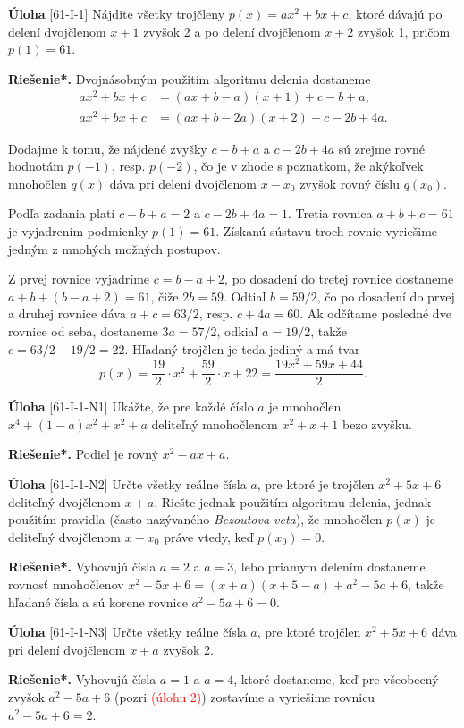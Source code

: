 \documentclass{article}
\newcommand{\rieh}{\textbf{Riešenie*.} }
\newcommand\todo[1]{\noindent\textcolor{red}{(#1)}}
\newcommand{\problem}[4]{
  \begin{tcolorbox}[breakable,notitle,boxrule=0pt,colback=light-gray,colframe=light-gray]
    \textbf{Úloha}
    [#1] #3
  \end{tcolorbox}
  \noindent#4
}
\begin{document}
\problem{61-I-1}{}{
Nájdite všetky trojčleny $p(x) = ax^2 + bx + c$, ktoré dávajú po delení dvojčlenom $x + 1$ zvyšok 2 a po delení dvojčlenom $x + 2$ zvyšok 1, pričom $p(1) = 61$.
}{
\rieh Dvojnásobným použitím algoritmu delenia dostaneme
\begin{align*}
    ax^2+ bx + c &= (ax + b - a)(x + 1) + c - b + a,\\
    ax^2+ bx + c &= (ax + b - 2a)(x + 2) + c - 2b + 4a.
\end{align*}

Dodajme k tomu, že nájdené zvyšky $c - b + a$ a $c - 2b + 4a$ sú zrejme rovné hodnotám $p(-1)$, resp. $p(-2)$, čo je v zhode s poznatkom, že akýkoľvek mnohočlen $q(x)$ dáva pri delení dvojčlenom $x - x_0$ zvyšok rovný číslu $q(x_0)$.

Podľa zadania platí $c - b + a = 2$ a $c - 2b + 4a = 1$. Tretia rovnica $a + b + c = 61$ je vyjadrením podmienky $p(1) = 61$. Získanú sústavu troch rovníc vyriešime jedným z mnohých možných postupov.

Z prvej rovnice vyjadríme $c = b - a + 2$, po dosadení do tretej rovnice dostaneme $a + b + (b - a + 2) = 61$, čiže $2b = 59$. Odtiaľ $b = 59/2$, čo po dosadení do prvej a druhej rovnice dáva $a+c = 63/2$, resp. $c+4a = 60$. Ak odčítame posledné dve rovnice od seba, dostaneme $3a = 57/2$, odkiaľ $a = 19/2$, takže $c = 63/2 - 19/2 = 22$. Hľadaný trojčlen je teda jediný a má tvar
$$p(x) =\frac{19}{2} \cdot x^2+\frac{59}{2}\cdot x + 22 = \frac{19x^2 + 59x + 44}{2}.$$
}


\problem{61-I-1-N1}{}{
Ukážte, že pre každé číslo $a$ je mnohočlen $x^4+(1-a)x^2+x^2+a$ deliteľný mnohočlenom $x^2+ x + 1$ bezo zvyšku.
}{
\rieh Podiel je rovný $x^2 - ax + a$.
}

\problem{61-I-1-N2}{}{
Určte všetky reálne čísla $a$, pre ktoré je trojčlen $x^2+5x+6$ deliteľný dvojčlenom $x+a$. Riešte jednak použitím algoritmu delenia, jednak použitím pravidla (často nazývaného \textit{Bezoutova veta}), že mnohočlen $p(x)$ je deliteľný dvojčlenom $x - x_0$ práve vtedy, keď $p(x_0) = 0$.
}{
\rieh Vyhovujú čísla $a = 2$ a $a = 3$, lebo priamym delením dostaneme rovnosť mnohočlenov $x^2+ 5x + 6 = (x + a)(x + 5 - a) + a^2 - 5a + 6$, takže hľadané čísla a sú korene rovnice $a^2 - 5a + 6 = 0$.
}

\problem{61-I-1-N3}{}{
Určte všetky reálne čísla $a$, pre ktoré trojčlen $x^2+ 5x + 6$ dáva pri delení dvojčlenom $x + a$ zvyšok 2.
}{
\rieh Vyhovujú čísla $a = 1$ a $a = 4$, ktoré dostaneme, keď pre všeobecný zvyšok $a^2 - 5a + 6$ (pozri \todo{úlohu 2}) zostavíme a vyriešime rovnicu $a^2 - 5a + 6 = 2$.
}
\end{document}

